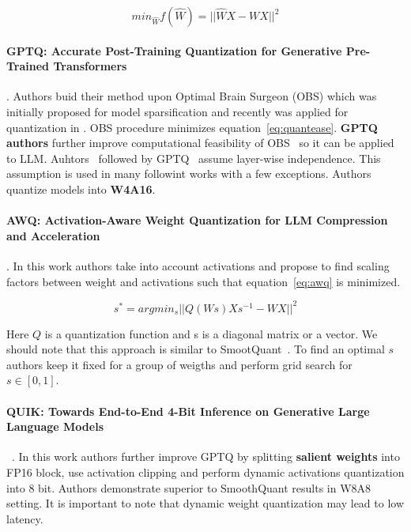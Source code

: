 \begin{equation}
    min_{\hat{W}}f(\hat{W}) = ||\hat{W}X - WX||^2
    \label{eq:quantease}
\end{equation}


\paragraph{GPTQ: Accurate Post-Training Quantization for Generative Pre-Trained Transformers} \cite{frantar2022gptq}.
Authors buid their method upon Optimal Brain Surgeon (OBS) which was initially proposed for model sparsification and recently was applied for quantization in \cite{frantar2022optimal}. OBS procedure minimizes equation~\ref{eq:quantease}. \textbf{GPTQ authors} further improve computational feasibility of OBS~\cite{frantar2022optimal} so it can be applied to LLM. Auhtors~\cite{frantar2022optimal} followed by GPTQ~\cite{frantar2022gptq} assume layer-wise independence. This assumption is used in many followint works with a few exceptions.  Authors quantize models into \textbf{W4A16}. 


\paragraph{AWQ: Activation-Aware Weight Quantization for LLM Compression and Acceleration}.
In this work authors take into account activations and propose to find scaling factors between weight and activations such that equation~\ref{eq:awq} is minimized.


\begin{equation}
    s^*= arg min_s || Q(Ws)Xs^{-1} - WX ||^2
    \label{eq:awq}
\end{equation}

Here $Q$ is a quantization function and s is a diagonal matrix or a vector. We should note that this approach is similar to SmootQuant~\cite{xiao2023smoothquant}. To find an optimal $s$ authors keep it fixed for a group of weigths and perform grid search for $s\in[0,1]$.

\paragraph{QUIK: Towards End-to-End 4-Bit Inference on Generative Large Language Models}~\cite{ashkboos2023towards}.
\label{sec:quik}
In this work authors further improve GPTQ by splitting \textbf{salient weights} into FP16 block, use activation clipping and perform dynamic activations quantization into 8 bit. Authors demonstrate superior to SmoothQuant results in W8A8 setting. It is important to note that dynamic weight quantization may lead to low latency. 

